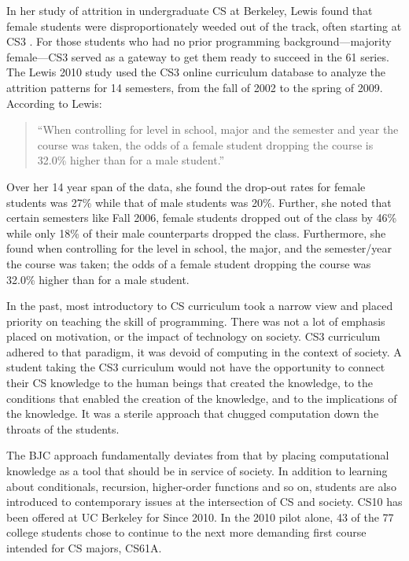\documentclass[twoside,openright,titlepage,numbers=noenddot,headinclude,%
               footinclude=true,cleardoublepage=empty,abstractoff,BCOR=5mm,%
               paper=a4,fontsize=11pt,ngerman,american]{scrreprt}
\numberwithin{theorem}{chapter}
\numberwithin{definition}{chapter}
\numberwithin{algorithm}{chapter}
\numberwithin{figure}{chapter}
\numberwithin{table}{chapter}
\numberwithin{equation}{chapter}
\begin{document}
In her study of attrition in undergraduate CS at Berkeley, Lewis found that female students were disproportionately weeded out of the track, often starting at CS3 \cite{Lewis:EECS-2010-132}. For those students who had no prior programming background---majority female---CS3 served as a gateway to get them ready to succeed in the 61 series. The Lewis 2010 study used the CS3 online curriculum database to analyze the attrition patterns for 14 semesters, from the fall of 2002 to the spring of 2009. According to Lewis:
\begin{quote}
``When controlling for level in school, major and the semester and year the course was taken, the odds of a female student dropping the course is 32.0\% higher than for a male student.''\cite{Lewis:EECS-2010-132}
\end{quote}
Over her 14 year span of the data, she found the drop-out rates for female students was 27\% while that of male students was 20\%. Further, she noted that certain semesters like Fall 2006, female students dropped out of the class by 46\% while only 18\% of their male counterparts dropped the class. Furthermore, she found when controlling for the level in school, the major, and the semester/year the course was taken; the odds of a female student dropping the course was 32.0\% higher than for a male student.

In the past, most introductory to CS curriculum took a narrow view and placed priority on teaching the skill of programming. There was not a lot of emphasis placed on motivation, or the impact of technology on society. CS3 curriculum adhered to that paradigm, it was devoid of computing in the context of society. A student taking the CS3 curriculum would not have the opportunity to connect their CS knowledge to the human beings that created the knowledge, to the conditions that enabled the creation of the knowledge, and to the implications of the knowledge. It was a sterile approach that chugged computation down the throats of the students. 

The BJC approach fundamentally deviates from that by placing computational knowledge as a tool that should be in service of society. In addition to learning about conditionals, recursion, higher-order functions and so on, students are also introduced to contemporary issues at the intersection of CS and society. CS10 has been offered at UC Berkeley for Since 2010. In the 2010 pilot alone, 43 of the 77 college students chose to continue to the next more demanding first course intended for CS majors, CS61A.
\end{document}
